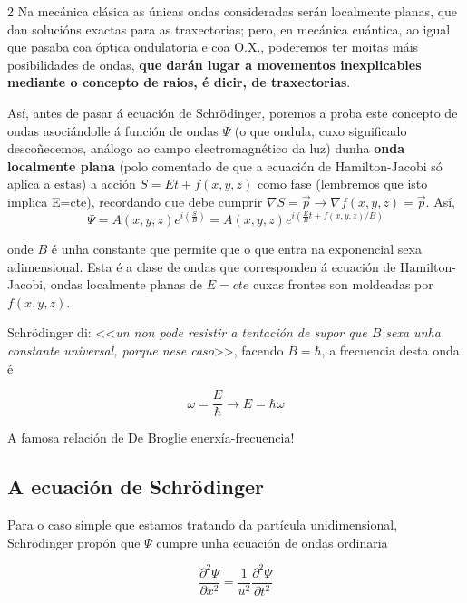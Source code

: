 \begin{multicols}{2}
Na mecánica clásica as únicas ondas consideradas serán localmente planas, que dan
solucións exactas para as traxectorias; pero, en mecánica cuántica, ao igual
que pasaba coa óptica ondulatoria e coa O.X., poderemos ter moitas máis
posibilidades de ondas, \textbf{que darán lugar a movementos inexplicables
mediante o concepto de raios, é dicir, de traxectorias}.

Así, antes de pasar á ecuación de Schrödinger, poremos a proba este concepto de
ondas asociándolle á función de ondas $\Psi$ (o que ondula, cuxo significado
descoñecemos, análogo ao campo electromagnético da luz) dunha \textbf{onda
localmente plana} (polo comentado de que a ecuación de Hamilton-Jacobi só
aplica a estas) a acción $S = Et + f(x,y,z)$ como fase (lembremos que isto
implica E=cte), recordando que debe cumprir $\nabla S=\vec{p}\rightarrow \nabla f(x,y,z) = \vec{p}$. Así,
\begin{equation}
    \Psi = A(x,y,z)e^{i(\frac{S}{B})} = A(x,y,z)e^{i(\frac{E}{B}t + f(x,y,z)/B)}
\end{equation}

onde $B$ é unha constante que permite que o que entra na exponencial sexa
adimensional. Esta é a clase de ondas que corresponden á ecuación de
Hamilton-Jacobi, ondas localmente planas de $E=cte$ cuxas frontes son moldeadas
por $f(x,y,z)$.

Schrödinger di: <<\textit{un non pode resistir a tentación de supor que $B$ sexa
unha constante universal, porque nese caso}>>, facendo $B=\hbar$, a frecuencia
desta onda é

\begin{equation}
    \omega=\frac{E}{\hbar} \rightarrow \boxed{E=\hbar \omega}
\end{equation}

A famosa relación de De Broglie enerxía-frecuencia!

\subsection*{A ecuación de Schrödinger}

Para o caso simple que estamos tratando da partícula unidimensional,
Schrödinger propón que $\Psi$ cumpre unha ecuación de ondas ordinaria

\begin{equation}
        \frac{\partial^2 \Psi}{\partial x^2} =
        \frac{1}{u^2}\frac{\partial^2 \Psi}{\partial t^2}
\end{equation}


\end{multicols}
